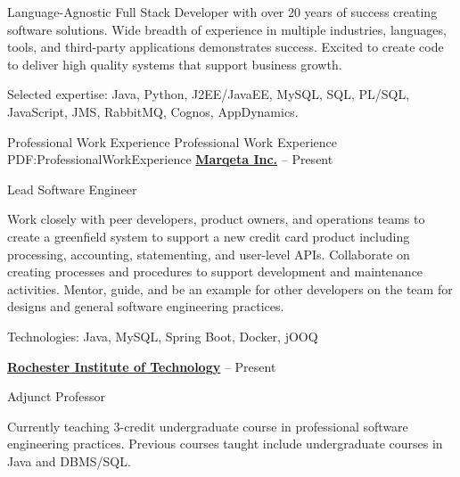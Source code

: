 \documentclass[letterpaper,MMMMyyyy,nonstopmode]{simpleresumecv}
\newif\ifLOCATION
\begin{document}
\begin{Body}
Language-Agnostic Full Stack Developer with over 20 years of success creating software solutions.
Wide breadth of experience in multiple industries, languages, tools, and third-party applications demonstrates success.
Excited to create code to deliver high quality systems that support business growth.
\iffalse
\Entry
Full Stack/Backend Java architect, developer, and consultant, specializing in Java/Oracle/JavaScript
solutions and integrations.
\fi
\Gap
Selected expertise: Java, Python, J2EE/JavaEE, MySQL, SQL, PL/SQL, JavaScript, JMS, RabbitMQ, Cognos, AppDynamics.
\iffalse
\Gap
\textit{Business Specialties}: Agile team leadership, customer-focused development, mentoring, requirements gathering and analysis, technical liaison, systems integration, business intelligence
\fi

\Section
{Professional\newline
Work Experience}
{Professional Work Experience}
{PDF:ProfessionalWorkExperience}
\Entry
\href{https://www.marqeta.com}
{\textbf{Marqeta Inc.}}
\hfill
{} -- Present

Lead Software Engineer
\ifLOCATION
\hfill
Rochester, New York
\fi

\begin{Detail}
\BulletItem
Work closely with peer developers, product owners, and operations teams to create a greenfield system to support a new credit card product including processing, accounting, statementing, and user-level APIs.
\BulletItem
Collaborate on creating processes and procedures to support development and maintenance activities.
\BulletItem
Mentor, guide, and be an example for other developers on the team for designs and general software engineering practices.


\Gap
Technologies: Java, MySQL, Spring Boot, Docker, jOOQ

\end{Detail}

\BigGap

\Entry
\href{http://ist.rit.edu/}
{\textbf{Rochester Institute of Technology}}
\hfill
{} --
Present

Adjunct Professor
\ifLOCATION
\hfill 
Rochester, New York
\fi

\begin{Detail}
\BulletItem
Currently teaching 3-credit undergraduate course in professional software engineering practices.
\BulletItem
Previous courses taught include undergraduate courses in Java and DBMS/SQL.
\end{Detail}


\end{Body}
\end{document}
